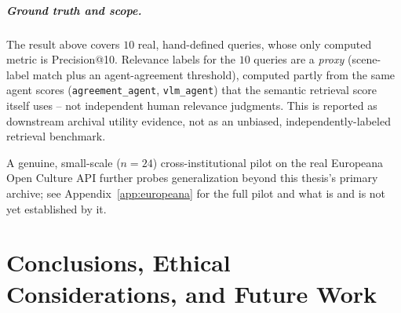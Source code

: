 \documentclass[12pt,a4paper]{report}
\begin{document}
\paragraph{Ground truth and scope.} The result above covers $10$ real, hand-defined queries, whose only computed metric is Precision@10. Relevance labels for the $10$ queries are a \emph{proxy} (scene-label match plus an agent-agreement threshold), computed partly from the same agent scores (\texttt{agreement\_agent}, \texttt{vlm\_agent}) that the semantic retrieval score itself uses -- not independent human relevance judgments. This is reported as downstream archival utility evidence, not as an unbiased, independently-labeled retrieval benchmark.

A genuine, small-scale ($n=24$) cross-institutional pilot on the real Europeana Open Culture API further probes generalization beyond this thesis's primary archive; see Appendix~\ref{app:europeana} for the full pilot and what is and is not yet established by it.

\chapter{Conclusions, Ethical Considerations, and Future Work}
\label{ch:conclusions}
\end{document}
